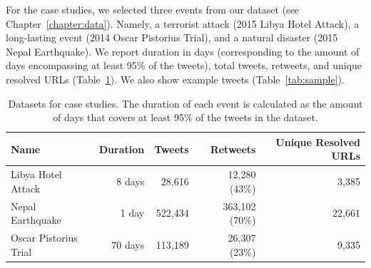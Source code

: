 %
%
%
For the case studies, we selected three events from our dataset (see
Chapter~\ref{chapter:data}). Namely, a terrorist attack (2015 Libya Hotel
Attack), a long-lasting event (2014 Oscar Pistorius Trial), and a natural
disaster (2015 Nepal Earthquake).
%
%
We report duration in days (corresponding to the amount of days encompassing at
least 95\% of the tweets), total tweets, retweets, and unique resolved URLs
(Table~\ref{tab:datasets}).
%
We also show example tweets (Table~\ref{tab:sample}).


\begin{table}[h]
  \centering
  \begin{tabular}{@{}lrrrr@{}}
  \toprule
  Name                  & Duration & Tweets & Retweets & Unique Resolved URLs  \\ \midrule
  Libya Hotel Attack    & 8 days   & 28,616 & 12,280 (43\%)  & 3,385            \\
  Nepal Earthquake      & 1 day   & 522,434 & 363,102 (70\%) & 22,661          \\ 
  Oscar Pistorius Trial & 70 days  & 113,189 & 26,307 (23\%)  & 9,335           \\ \bottomrule
  \end{tabular}
  \caption[Datasets for case studies.]{Datasets for case studies. The duration of each event is calculated as the amount of days that covers at least 95\% of the tweets in the dataset.}
  \label{tab:datasets}
\end{table}


